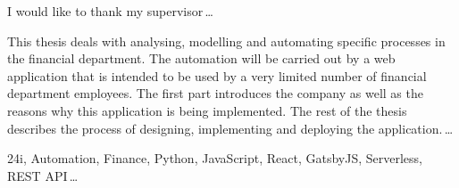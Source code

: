 \documentclass[12pt,oneside]{fithesis2}
\begin{document}
  \FrontMatter
    \ThesisTitlePage
    \begin{ThesisDeclaration}
      \DeclarationText
      \AdvisorName
    \end{ThesisDeclaration}
    \begin{ThesisThanks}
      I would like to thank my supervisor\,\dots
    \end{ThesisThanks}
    \begin{ThesisAbstract}
      This thesis deals with analysing, modelling and automating specific processes in the financial department. The automation will be carried out by a web application that is intended to be used by a very limited number of financial department employees. The first part introduces the company as well as the reasons why this application is being implemented. The rest of the thesis describes the process of designing, implementing and deploying the application.\,\dots
    \end{ThesisAbstract}
    \begin{ThesisKeyWords}
      24i, Automation, Finance, Python, JavaScript, React, GatsbyJS, Serverless, REST API\,\dots
    \end{ThesisKeyWords}
    \tableofcontents
  
  \MainMatter
\end{document}

